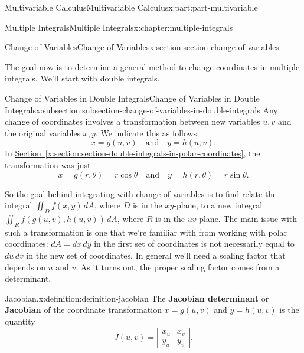\documentclass[twoside,10pt,]{book}
\newcommand{\xreffont}{\relax}
\newcommand{\terminology}[1]{\textbf{#1}}
\numberwithin{equation}{part}
\newcommand{\qq}[1]{\quad\text{#1}\quad}
\newcommand{\amp}{&}
\begin{document}
\begin{partptx}{Multivariable Calculus}{}{Multivariable Calculus}{}{}{x:part:part-multivariable}
\begin{chapterptx}{Multiple Integrals}{}{Multiple Integrals}{}{}{x:chapter:multiple-integrals}
\typeout{************************************************}
%
\begin{sectionptx}{Change of Variables}{}{Change of Variables}{}{}{x:section:section-change-of-variables}
\begin{introduction}{}%
The goal now is to determine a general method to change coordinates in multiple integrals. We'll start with double integrals.%
\end{introduction}%
%
%
\typeout{************************************************}
\typeout{************************************************}
%
\begin{subsectionptx}{Change of Variables in Double Integrals}{}{Change of Variables in Double Integrals}{}{}{x:subsection:subsection-change-of-variables-in-double-integrals}
Any change of coordinates involves a transformation between new variables \(u,v\) and the original variables \(x,y\). We indicate this as follows:%
\begin{equation*}
x = g(u,v) \qq{and} y = h(u,v)\text{.}
\end{equation*}
In \hyperref[x:section:section-double-integrals-in-polar-coordinates]{Section~{\xreffont\ref{x:section:section-double-integrals-in-polar-coordinates}}}, the transformation was just%
\begin{equation*}
x = g(r,\theta) = r\cos\theta \qq{and} y = h(r,\theta) = r\sin\theta\text{.}
\end{equation*}
%
\par
So the goal behind integrating with change of variables is to find relate the integral \(\iint_{D}f(x,y)\,dA\), where \(D\) is in the \(xy\)-plane, to a new integral \(\iint_{R}f(g(u,v),h(u,v))\,dA\), where \(R\) is in the \(uv\)-plane. The main issue with such a transformation is one that we're familiar with from working with polar coordinates: \(dA = dx\,dy\) in the first set of coordinates is not necessarily equal to \(du\,dv\) in the new set of coordinates. In general we'll need a scaling factor that depends on \(u\) and \(v\). As it turns out, the proper scaling factor comes from a determinant.%
\begin{definition}{Jacobian.}{x:definition:definition-jacobian}%
%
The \terminology{Jacobian determinant} or \terminology{Jacobian} of the coordinate transformation \(x = g(u,v)\) and \(y = h(u,v)\) is the quantity%
\begin{equation*}
J(u,v) = \left|\begin{array}{cc} x_{u} \amp x_{v} \\ y_{u} \amp y_{v}\end{array}\right|\text{.}

\end{equation*}
\end{definition}
\end{subsectionptx}
\end{sectionptx}
\end{chapterptx}
\end{partptx}
\end{document}
